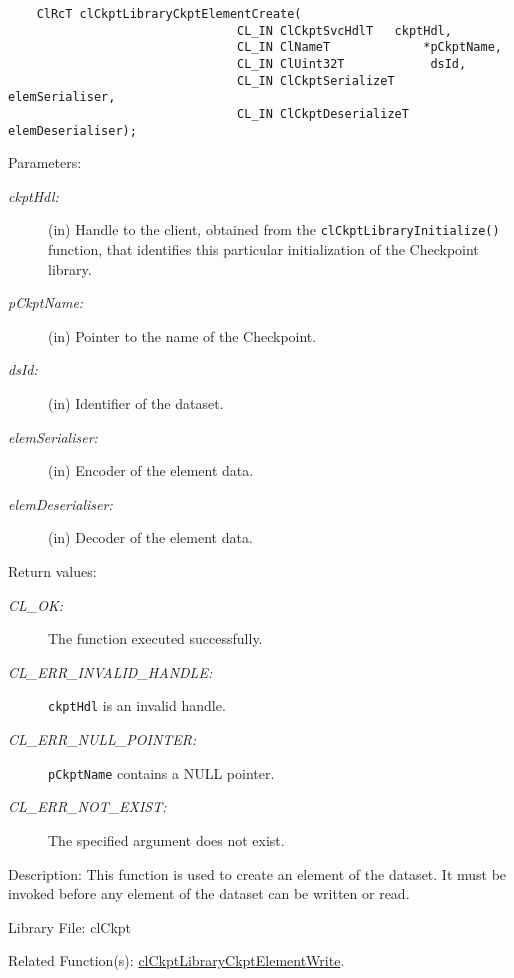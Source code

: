 \begin{flushleft}
\begin{Desc}
\footnotesize\begin{verbatim}    ClRcT clCkptLibraryCkptElementCreate(
                                CL_IN ClCkptSvcHdlT   ckptHdl,
                                CL_IN ClNameT             *pCkptName,
                                CL_IN ClUint32T            dsId,
                                CL_IN ClCkptSerializeT     elemSerialiser,
                                CL_IN ClCkptDeserializeT   elemDeserialiser);
\end{verbatim}
\normalsize
\end{Desc}
\begin{Desc}
\item[Parameters:]
\begin{description}
\item[{\em ckpt\-Hdl:}](in) Handle to the client, obtained from the {\tt{clCkptLibraryInitialize()}} function, that identifies this particular 
initialization of the Checkpoint library. 
\item[{\em p\-Ckpt\-Name:}](in) Pointer to the name of the Checkpoint. 
\item[{\em ds\-Id:}](in) Identifier of the dataset.
\item[{\em elem\-Serialiser:}](in) Encoder of the element data. \item[{\em elem\-Deserialiser:}](in) Decoder of the element data.\end{description}
\end{Desc}
\begin{Desc}
\item[Return values:]
\begin{description}
\item[{\em CL\_\-OK:}]The function executed successfully. \item[{\em CL\_\-ERR\_\-INVALID\_\-HANDLE:}]{\tt{ckptHdl}} is an invalid handle.
\item[{\em CL\_\-ERR\_\-NULL\_\-POINTER:}]{\tt{pCkptName}} contains a NULL pointer. \item[{\em CL\_\-ERR\_\-NOT\_\-EXIST:}]The specified argument does not exist.
\end{description}
\end{Desc}
\begin{Desc}
\item[Description:]This function is used to create an element of the dataset. It must be invoked before any element of the dataset can be written or 
read.\end{Desc}
\begin{Desc}
\item[Library File:]cl\-Ckpt\end{Desc}
\begin{Desc}
\item[Related Function(s):]\hyperlink{pageckpt212}{cl\-Ckpt\-Library\-Ckpt\-Element\-Write}. \end{Desc}
\newpage



\end{flushleft}
